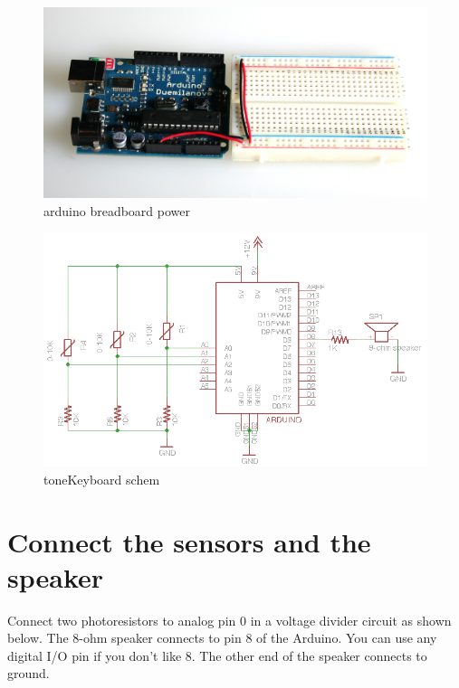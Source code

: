 \begin{figure}[!htb]
 \centering
 \includegraphics[scale=0.1]{img/toneout/arduino_breadboard_power.jpg}
 \caption{arduino breadboard power}
 \label{arduino breadboard power}
\end{figure}

\begin{figure}[!htb]
 \centering
 \includegraphics[scale=0.3]{img/toneout/toneKeyboard_schem.png}
 \caption{toneKeyboard schem}
 \label{toneKeyboard schem}
\end{figure}


\section{Connect the sensors and the speaker}

Connect two photoresistors to analog pin 0 in a voltage divider circuit as shown below. The 8-ohm speaker connects to pin 8 of the Arduino. You can use any digital I/O pin if you don't like 8. The other end of the speaker connects to ground.


